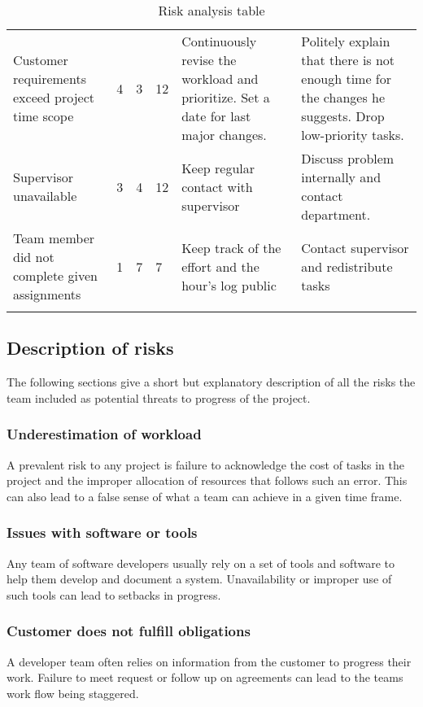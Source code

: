 \begin{longtable}{|p{3.6cm}!{\vrule width -1pt}l!{\vrule width -1pt}l!{\vrule width -1pt}l!{\vrule width -1pt}p{4.8cm}!{\vrule width -1pt}p{4.8cm}|}
Customer requirements exceed project time scope& 4 & 3 & 12 & Continuously revise the workload and prioritize. Set a date for last major changes. & Politely explain that there is not enough time for the changes he suggests. Drop low-priority tasks.\\
Supervisor unavailable & 3 & 4 & 12 & Keep regular contact with supervisor & Discuss problem internally and contact department.\\
Team member did not complete given assignments & 1 & 7 & 7 & Keep track of the effort and the hour's log public & Contact supervisor and redistribute tasks \\\hline
\caption{Risk analysis table}
\end{longtable}

\subsection{Description of risks}
The following sections give a short but explanatory description of all the risks the team included as potential threats to progress of the project.

\subsubsection{Underestimation of workload}
A prevalent risk to any project is failure to acknowledge the cost of tasks in the project and the improper allocation of resources that follows such an error. This can also lead to a false sense of what a team can achieve in a given time frame.

\subsubsection{Issues with software or tools}
Any team of software developers usually rely on a set of tools and software to help them develop and document a system. Unavailability or improper use of such tools can lead to setbacks in progress.

\subsubsection{Customer does not fulfill obligations}
A developer team often relies on information from the customer to progress their work. Failure to meet request or follow up on agreements can lead to the teams work flow being staggered.

